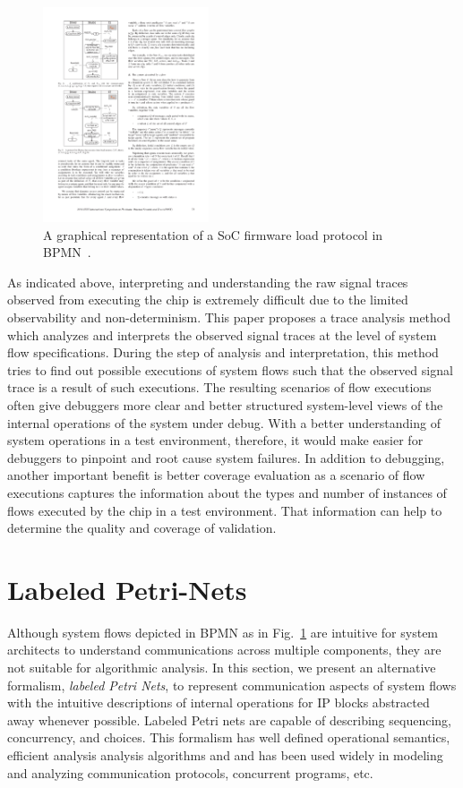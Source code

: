 \documentclass[conference]{IEEEtran}
\begin{document}
\begin{figure}[tb]
\begin{center}
\includegraphics[height=2.5in]{figures/bpmn-flow-ex}
\caption{A graphical representation of a SoC firmware load protocol in BPMN~\cite{Krstic14HOST}.}
\label{flow-spec-ex}
\end{center}
\end{figure}
  
As indicated above, interpreting and understanding the raw signal traces observed from executing the chip is extremely difficult due to the limited observability and non-determinism.  This paper proposes a trace analysis method which analyzes and interprets the observed signal traces at the level of system flow specifications.  During the step of analysis and interpretation, this method tries to find out possible executions of system flows such that the observed signal trace is a result of such executions.  The resulting scenarios of flow executions often give debuggers more clear and better structured system-level views of the internal operations of the system under debug.  With a better understanding of system operations in a test environment, therefore, it would make easier for debuggers to pinpoint and root cause system failures.  In addition to debugging, another important benefit is better coverage evaluation as a scenario of flow executions captures the information about the types and number of instances of flows executed by the chip in a test environment.  That information can help to determine the quality and coverage of validation.   

\section{Labeled Petri-Nets}

Although system flows depicted in BPMN as in Fig.~\ref{flow-spec-ex} are intuitive for system architects to understand communications across multiple components, they are not suitable for algorithmic analysis.  In this section, we present an alternative formalism, \emph{labeled Petri Nets}, to represent communication aspects of system flows with the intuitive descriptions of internal operations for IP blocks abstracted away whenever possible.  Labeled Petri nets are capable of describing sequencing, concurrency, and choices.   This formalism has well defined operational semantics, efficient analysis analysis algorithms and and has been used widely in modeling and analyzing communication protocols, concurrent programs, etc. 
\end{document}
